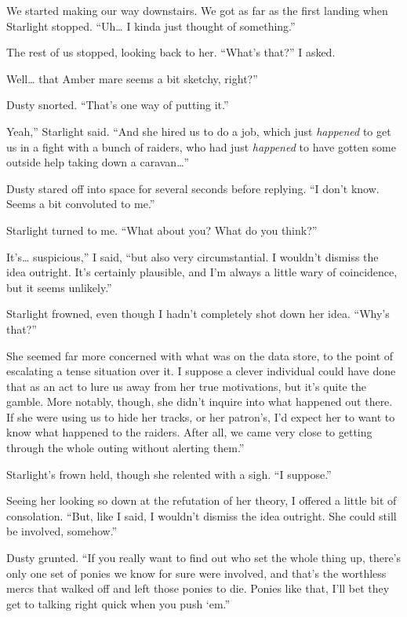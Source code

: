 We started making our way downstairs. We got as far as the first landing when Starlight stopped. “Uh… I kinda just thought of something.”

The rest of us stopped, looking back to her. “What’s that?” I asked.

\leavevmode{}Well… that Amber mare seems a bit sketchy, right?”

Dusty snorted. “That’s one way of putting it.”

\leavevmode{}Yeah,” Starlight said. “And she hired us to do a job, which just \textit{happened} to get us in a fight with a bunch of raiders, who had just \textit{happened} to have gotten some outside help taking down a caravan…”

Dusty stared off into space for several seconds before replying. “I don’t know. Seems a bit convoluted to me.”

Starlight turned to me. “What about you? What do you think?”

\leavevmode{}It’s… suspicious,” I said, “but also very circumstantial. I wouldn’t dismiss the idea outright. It’s certainly plausible, and I’m always a little wary of coincidence, but it seems unlikely.”

Starlight frowned, even though I hadn’t completely shot down her idea. “Why’s that?”

\leavevmode{}She seemed far more concerned with what was on the data store, to the point of escalating a tense situation over it. I suppose a clever individual could have done that as an act to lure us away from her true motivations, but it’s quite the gamble. More notably, though, she didn’t inquire into what happened out there. If she were using us to hide her tracks, or her patron’s, I’d expect her to want to know what happened to the raiders. After all, we came very close to getting through the whole outing without alerting them.”

Starlight’s frown held, though she relented with a sigh. “I suppose.”

Seeing her looking so down at the refutation of her theory, I offered a little bit of consolation. “But, like I said, I wouldn’t dismiss the idea outright. She could still be involved, somehow.”

Dusty grunted. “If you really want to find out who set the whole thing up, there’s only one set of ponies we know for sure were involved, and that’s the worthless mercs that walked off and left those ponies to die. Ponies like that, I’ll bet they get to talking right quick when you push ‘em.”

